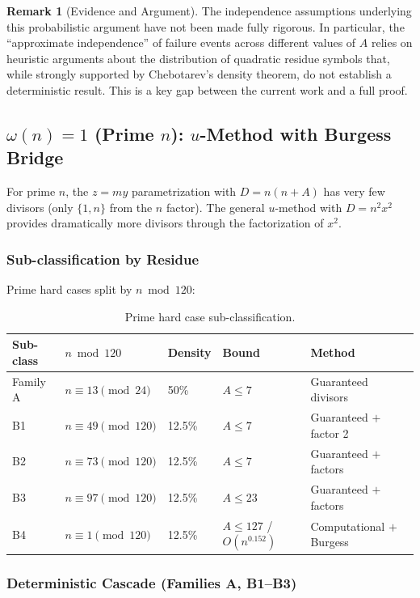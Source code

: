 \documentclass[11pt,a4paper]{article}
\theoremstyle{plain}
\theoremstyle{plain}
\theoremstyle{definition}
\newtheorem{remark}[theorem]{Remark}
\numberwithin{equation}{section}
\begin{document}
\begin{remark}[Evidence and Argument]
The independence assumptions underlying this probabilistic argument have not been made fully rigorous. In particular, the ``approximate independence'' of failure events across different values of $A$ relies on heuristic arguments about the distribution of quadratic residue symbols that, while strongly supported by Chebotarev's density theorem, do not establish a deterministic result. This is a key gap between the current work and a full proof.
\end{remark}

\subsection{\texorpdfstring{$\omega(n) = 1$}{omega(n) = 1} (Prime \texorpdfstring{$n$}{n}): \texorpdfstring{$u$}{u}-Method with Burgess Bridge}

For prime $n$, the $z = my$ parametrization with $D = n(n+A)$ has very few divisors (only $\{1, n\}$ from the $n$ factor). The general $u$-method with $D = n^2 x^2$ provides dramatically more divisors through the factorization of $x^2$.

\subsubsection{Sub-classification by Residue}

Prime hard cases split by $n \bmod 120$:

\begin{table}[h]
\centering
\begin{tabular}{lllll}
\toprule
Sub-class & $n \bmod 120$ & Density & Bound & Method \\
\midrule
Family A & $n \equiv 13 \pmod{24}$ & 50\% & $A \leq 7$ & Guaranteed divisors \\
B1 & $n \equiv 49 \pmod{120}$ & 12.5\% & $A \leq 7$ & Guaranteed $+$ factor 2 \\
B2 & $n \equiv 73 \pmod{120}$ & 12.5\% & $A \leq 7$ & Guaranteed $+$ factors \\
B3 & $n \equiv 97 \pmod{120}$ & 12.5\% & $A \leq 23$ & Guaranteed $+$ factors \\
B4 & $n \equiv 1 \pmod{120}$ & 12.5\% & $A \leq 127$ / $O(n^{0.152})$ & Computational $+$ Burgess \\
\bottomrule
\end{tabular}
\caption{Prime hard case sub-classification.}
\end{table}

\subsubsection{Deterministic Cascade (Families A, B1--B3)}
\end{document}
